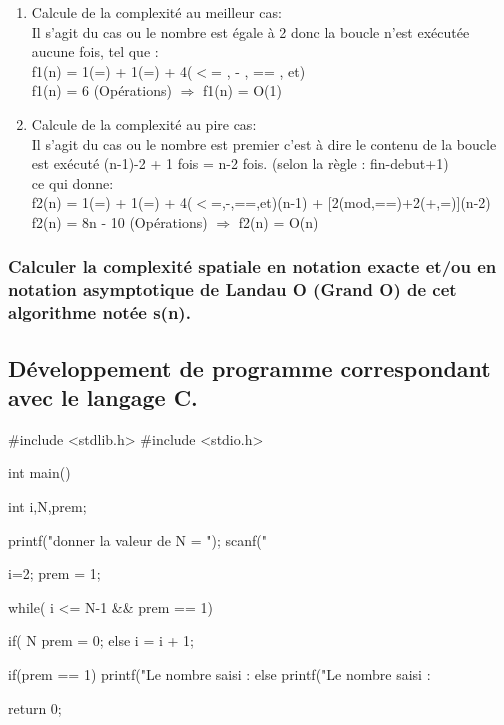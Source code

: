 \documentclass[12pt]{article}
\begin{document}
\begin{enumerate}
	\item Calcule de la complexité au meilleur cas:
	\\
	Il s'agit du cas ou le nombre est égale à 2 donc la boucle n'est exécutée aucune fois, tel que :
	\\
	f1(n) = 1(=) + 1(=) + 4($<$= , - , == , et) 
	\\
	\color{blue}
	f1(n) = 6 (Opérations) $\Rightarrow$ f1(n) = O(1)
	\color{black}
	\\
	\item Calcule de la complexité au pire cas:
	\\
	Il s'agit du cas ou le nombre est premier c'est à dire le contenu de la boucle est exécuté (n-1)-2 + 1 fois = n-2 fois.
	(selon la règle : fin-debut+1)
	\\
	ce qui donne:
	\\
	f2(n) = 1(=) + 1(=) + 4($<$=,-,==,et)(n-1) + [2(mod,==)+2(+,=)](n-2) 
	\\
	\color{blue}
	f2(n) = 8n - 10 (Opérations) $\Rightarrow$ f2(n) = O(n)
	\color{black}
\end{enumerate}




\subsubsection{Calculer la complexité spatiale en notation exacte et/ou en notation asymptotique de Landau O (Grand O) de  cet  algorithme notée s(n).}



\subsection{Développement de programme correspondant avec le langage C.}


\begin{sql}
#include <stdlib.h>
#include <stdio.h>

int main()
{

	int i,N,prem;


	printf("donner la valeur de N = ");
	scanf("%

	i=2;
	prem = 1;

	while( i <= N-1 && prem == 1){

		if( N%
			prem = 0;
		else
			i = i + 1;
	}

	if(prem == 1)
    {
        printf("Le nombre saisi : %
    }
	else{
        printf("Le nombre saisi : %
	}


return 0;

}

\end{sql}
\end{document}
